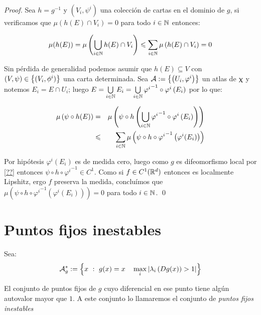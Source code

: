 \begin{proof}
	Sea $h = g^{-1}$ y $\left(V_i, \psi^i\right)$ una colecci\'on de cartas en el dominio de $g$, si verificamos que $\mu\left(h\left(E\right) \cap V_i\right) = 0$ para todo $i \in {\mathbb{N}}$ entonces:
	
	\begin{equation*}
	\mu(h(E)) = \mu \left(\bigcup\limits_{i \in {\mathbb{N}}}{h(E) \cap V_i}\right) \leqslant \sum\limits_{i \in {\mathbb{N}}}{\mu} \left(h(E) \cap V_i\right) = 0
	\end{equation*}
	
	Sin p\'erdida de generalidad podemos asumir que $h(E) \subseteq V$ con $(V, \psi) \in \left\lbrace(V_i, \phi^i)\right\rbrace$ una carta determinada. Sea $\mathcal{A} := \left\lbrace\left(U_i, \varphi^i \right)\right\rbrace$ un atlas de $\upchi$ y notemos $E_i = E \cap U_i$; luego $E = \bigcup\limits_{i \in {\mathbb{N}}}{E_i} = \bigcup\limits_{i \in {\mathbb{N}}}{{\varphi^i}^{-1} \circ \varphi^{i} \left(E_i\right)}$ por lo que:
	
	\begin{equation*}
		\begin{aligned}
		\mu\left(\psi \circ h(E)\right) & = & \mu \left(\psi \circ h \left(\bigcup\limits_{i \in {\mathbb{N}}}{{\varphi^i}^{-1} \circ \varphi^{i} \left(E_i\right)}\right)\right)\\
		& \leqslant & \sum\limits_{i \in {\mathbb{N}}}{\mu \left(\psi \circ h \circ {\varphi^{i}}^{-1} \left(\varphi^i (E_i)\right)\right)}
		\end{aligned}
	\end{equation*}
	
	
	Por hip\'otesis $\varphi^i(E_i)$ es de medida cero, luego como $g$ es difeomorfismo local por \ref{??} entonces $\psi \circ h \circ {\varphi^{i}}^{-1} \in C^1$. Como si $f \in C^1({\mathbb{R}}^d)$ entonces  es localmente Lipshitz, ergo $f$ preserva la medida, conclu\'imos que ${\mu \left(\psi \circ h \circ {\varphi^{i}}^{-1} \left(\varphi^i (E_i)\right)\right)} = 0$ para todo $i \in {\mathbb{N}}$. \qed

\end{proof}

\section{Puntos fijos inestables}

\begin{definition}
	Sea:
	\begin{equation*}
	\label{def:punto fijo inestable de g}
	\mathcal{A}_{g}^{*} := \left\lbrace x \ : \ g(x) = x \quad \max\limits_{i}\left\lvert\lambda_i \left(Dg(x)\right) > 1\right\rvert\right\rbrace
	\end{equation*}
	
	El conjunto de puntos fijos de $g$ cuyo diferencial en ese punto tiene alg\'un autovalor mayor que $1$. A este conjunto lo llamaremos el conjunto de \textit{puntos fijos inestables}
	
\end{definition}

